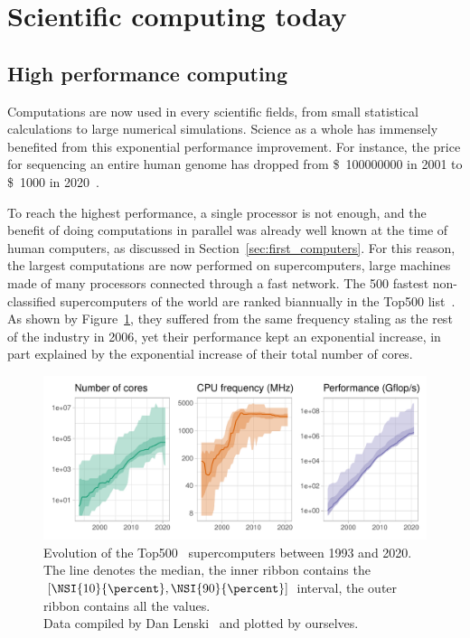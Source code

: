     \section{Scientific computing today}%
    \label{sec:scientific_computing_today}

        \subsection{High performance computing}%
        \label{sub:hpc}

            Computations are now used in every scientific fields, from small statistical calculations to large numerical
            simulations. Science as a whole has immensely benefited from this exponential performance improvement. For
            instance, the price for sequencing an entire human genome has dropped from \SI{100000000}[\$]{} in 2001 to
            \SI{1000}[\$]{} in 2020~\cite{genome_sequencing}.

            To reach the highest performance, a single processor is not enough, and the benefit of doing computations in
            parallel was already well known at the time of human computers, as discussed in Section~\ref{sec:first_computers}.
            For this reason, the largest computations are now performed on supercomputers, large machines made of many
            processors connected through a fast network. The 500 fastest non-classified supercomputers of the world are
            ranked biannually in the Top500 list~\cite{top500}. As shown by Figure~\ref{fig:context:top500}, they suffered from
            the same frequency staling as the rest of the industry in 2006, yet their performance kept an exponential
            increase, in part explained by the exponential increase of their total number of cores.

            \begin{figure}[htbp]
                \centering
                \includegraphics[width=\textwidth]{img/context/top500.pdf}
                \caption{\label{fig:context:top500}
                Evolution of the Top500~\cite{top500} supercomputers between 1993 and 2020.  The line denotes the median, the inner ribbon
                contains the \([\NSI{10}{\percent}, \NSI{90}{\percent}]\) interval, the outer ribbon contains all the
                values.\\ Data compiled by Dan Lenski~\cite{top500_compiled} and plotted by ourselves.}
            \end{figure}

